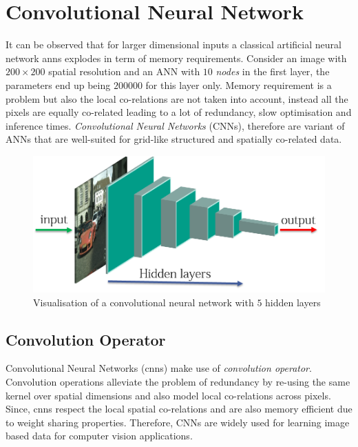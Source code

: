 \section{Convolutional Neural Network}

It can be observed that for larger dimensional inputs a classical artificial neural network \gls{anns} explodes in term of memory requirements. Consider an image with $200\times200$ spatial resolution and an ANN with $10$ \textit{nodes} in the first layer, the parameters end up being $200000$ for this layer only. Memory requirement is a problem but also the local co-relations are not taken into account, instead all the pixels are equally co-related leading to a lot of redundancy, slow optimisation and inference times. \textit{Convolutional Neural Networks} (CNNs), therefore are variant of ANNs that are well-suited for grid-like structured and spatially co-related data. 
\bigskip

\begin{figure}[!ht]
	 \centering 
        \includegraphics[scale = 0.7]{Graphics/Fundamentals/CNN.png} 
	\caption[Convolutional Neural Network]{Visualisation of a convolutional neural network with $5$ hidden layers}
	\label{fig: CNN} 
\end{figure}

\subsection{Convolution Operator}
Convolutional Neural Networks (\gls{cnns}) make use of \textit{convolution operator}. Convolution operations alleviate the problem of redundancy by re-using the same kernel over spatial dimensions and also model local co-relations across pixels. Since, \gls{cnns} respect the local spatial co-relations and are also memory efficient due to weight sharing properties. Therefore, CNNs are widely used for learning image based data for computer vision applications.

